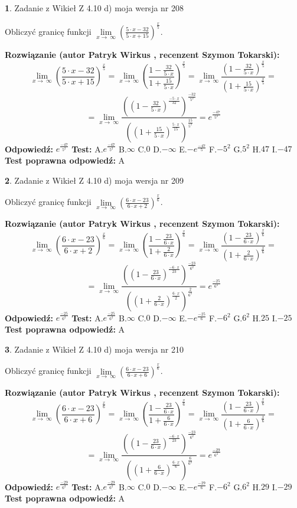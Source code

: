 \documentclass[12pt, a4paper]{article}
\theoremstyle{definition} %
\newtheorem{zad}{}
\newcommand{\zadStart}[1]{\begin{zad}#1\newline}
\newcommand{\zadStop}{\end{zad}}
\newcommand{\rozwStart}[2]{\noindent \textbf{Rozwiązanie (autor #1 , recenzent #2): }\newline}
\newcommand{\rozwStop}{\newline}
\newcommand{\odpStart}{\noindent \textbf{Odpowiedź:}\newline}
\newcommand{\odpStop}{\newline}
\newcommand{\testStart}{\noindent \textbf{Test:}\newline}
\newcommand{\testStop}{\newline}
\newcommand{\kluczStart}{\noindent \textbf{Test poprawna odpowiedź:}\newline}
\newcommand{\kluczStop}{\newline}
\begin{document}
\zadStart{Zadanie z Wikieł Z 4.10 d) moja wersja nr 208}


Obliczyć granicę funkcji  $\lim\limits_{x\to\ \infty}(\frac{5\cdot x-32}{5\cdot x+15})^{\frac{x}{5}}$.
\zadStop
\rozwStart{Patryk Wirkus}{Szymon Tokarski}
$$\lim\limits_{x\to\ \infty}(\frac{5\cdot x-32}{5\cdot x+15})^{\frac{x}{5}} = \lim\limits_{x\to\ \infty}(\frac{1-\frac{32}{5\cdot x}}{1+\frac{15}{5\cdot x}})^{\frac{x}{5}}=\lim\limits_{x\to\ \infty}\frac{(1-\frac{32}{5\cdot x})^{\frac{x}{5}}}{(1+\frac{15}{5\cdot x})^{\frac{x}{5}}}=$$
$$=\lim\limits_{x\to\ \infty}\frac{((1-\frac{32}{5\cdot x})^{\frac{-5\cdot x}{32}})^{\frac{-32}{5^{2}}}}{((1+\frac{15}{5\cdot x})^{\frac{5\cdot x}{15}})^{\frac{15}{5^{2}}}}=e^{\frac{-47}{5^{2}}}$$
\rozwStop
\odpStart
$e^{\frac{-47}{5^{2}}}$
\odpStop
\testStart
A.$e^{\frac{-47}{5^{2}}}$ B.$\infty$ C.$0$ D.$-\infty$ E.$-e^{\frac{-47}{5}}$
F.$-5^{2}$ G.$5^{2}$
H.$47$
I.$-47$
\testStop
\kluczStart
A
\kluczStop



\zadStart{Zadanie z Wikieł Z 4.10 d) moja wersja nr 209}


Obliczyć granicę funkcji  $\lim\limits_{x\to\ \infty}(\frac{6\cdot x-23}{6\cdot x+2})^{\frac{x}{6}}$.
\zadStop
\rozwStart{Patryk Wirkus}{Szymon Tokarski}
$$\lim\limits_{x\to\ \infty}(\frac{6\cdot x-23}{6\cdot x+2})^{\frac{x}{6}} = \lim\limits_{x\to\ \infty}(\frac{1-\frac{23}{6\cdot x}}{1+\frac{2}{6\cdot x}})^{\frac{x}{6}}=\lim\limits_{x\to\ \infty}\frac{(1-\frac{23}{6\cdot x})^{\frac{x}{6}}}{(1+\frac{2}{6\cdot x})^{\frac{x}{6}}}=$$
$$=\lim\limits_{x\to\ \infty}\frac{((1-\frac{23}{6\cdot x})^{\frac{-6\cdot x}{23}})^{\frac{-23}{6^{2}}}}{((1+\frac{2}{6\cdot x})^{\frac{6\cdot x}{2}})^{\frac{2}{6^{2}}}}=e^{\frac{-25}{6^{2}}}$$
\rozwStop
\odpStart
$e^{\frac{-25}{6^{2}}}$
\odpStop
\testStart
A.$e^{\frac{-25}{6^{2}}}$ B.$\infty$ C.$0$ D.$-\infty$ E.$-e^{\frac{-25}{6}}$
F.$-6^{2}$ G.$6^{2}$
H.$25$
I.$-25$
\testStop
\kluczStart
A
\kluczStop



\zadStart{Zadanie z Wikieł Z 4.10 d) moja wersja nr 210}


Obliczyć granicę funkcji  $\lim\limits_{x\to\ \infty}(\frac{6\cdot x-23}{6\cdot x+6})^{\frac{x}{6}}$.
\zadStop
\rozwStart{Patryk Wirkus}{Szymon Tokarski}
$$\lim\limits_{x\to\ \infty}(\frac{6\cdot x-23}{6\cdot x+6})^{\frac{x}{6}} = \lim\limits_{x\to\ \infty}(\frac{1-\frac{23}{6\cdot x}}{1+\frac{6}{6\cdot x}})^{\frac{x}{6}}=\lim\limits_{x\to\ \infty}\frac{(1-\frac{23}{6\cdot x})^{\frac{x}{6}}}{(1+\frac{6}{6\cdot x})^{\frac{x}{6}}}=$$
$$=\lim\limits_{x\to\ \infty}\frac{((1-\frac{23}{6\cdot x})^{\frac{-6\cdot x}{23}})^{\frac{-23}{6^{2}}}}{((1+\frac{6}{6\cdot x})^{\frac{6\cdot x}{6}})^{\frac{6}{6^{2}}}}=e^{\frac{-29}{6^{2}}}$$
\rozwStop
\odpStart
$e^{\frac{-29}{6^{2}}}$
\odpStop
\testStart
A.$e^{\frac{-29}{6^{2}}}$ B.$\infty$ C.$0$ D.$-\infty$ E.$-e^{\frac{-29}{6}}$
F.$-6^{2}$ G.$6^{2}$
H.$29$
I.$-29$
\testStop
\kluczStart
A
\kluczStop
\end{document}
